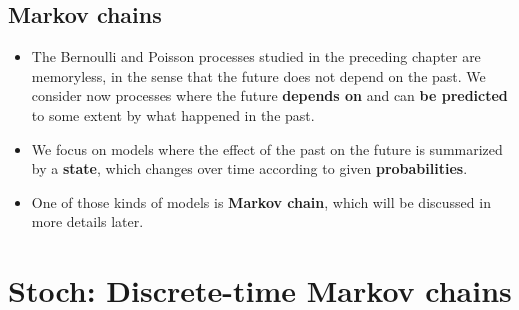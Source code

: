 \documentclass[12pt]{report}
\renewcommand{\_}{\kern-1.5pt\textunderscore\kern-1.5pt}
\begin{document}
\subsection*{Markov chains}
\begin{itemize}
	\item The Bernoulli and Poisson processes studied in the preceding chapter are memoryless, in the sense that the future does not depend on the past. We consider now processes where the future \textbf{depends on }and can \textbf{be predicted} to some extent by what happened in the past. \par

	\item We focus on models where the effect of the past on the future is summarized by a \textbf{state}, which changes over time according to given \textbf{probabilities}.\par

	\item One of those kinds of models is \textbf{Markov chain}, which will be discussed in more details later.
\end{itemize}\par

\section*{Stoch: Discrete-time Markov chains}
\end{document}
